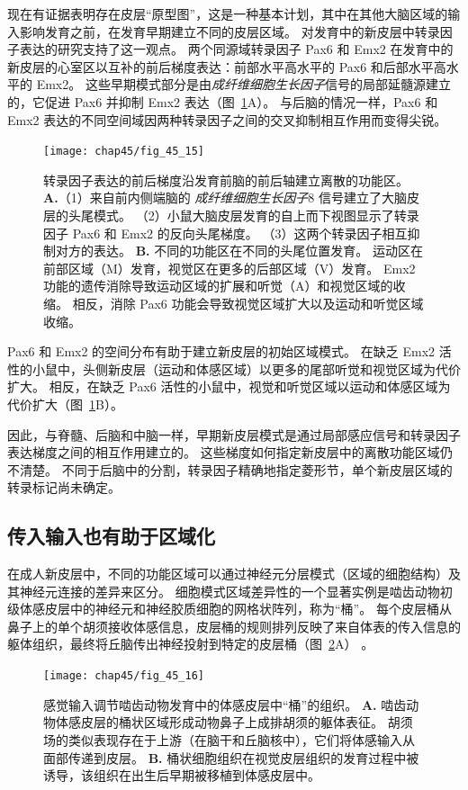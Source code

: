 现在有证据表明存在皮层“原型图”，这是一种基本计划，其中在其他大脑区域的输入影响发育之前，在发育早期建立不同的皮层区域。
对发育中的新皮层中转录因子表达的研究支持了这一观点。
两个同源域转录因子 Pax6 和 Emx2 在发育中的新皮层的心室区以互补的前后梯度表达：前部水平高水平的 Pax6 和后部水平高水平的 Emx2。
这些早期模式部分是由\textit{成纤维细胞生长因子}信号的局部延髓源建立的，它促进 Pax6 并抑制 Emx2 表达（图~\ref{fig:45_15}A）。
与后脑的情况一样，Pax6 和 Emx2 表达的不同空间域因两种转录因子之间的交叉抑制相互作用而变得尖锐。


\begin{figure}[htbp]
	\centering
	\texttt{[image: chap45/fig\_45\_15]}
	\caption{转录因子表达的前后梯度沿发育前脑的前后轴建立离散的功能区\cite{hamasaki2004emx2}。
		\textbf{A.}（1）来自前内侧端脑的 \textit{成纤维细胞生长因子}8 信号建立了大脑皮层的头尾模式。
		（2）小鼠大脑皮层发育的自上而下视图显示了转录因子 Pax6 和 Emx2 的反向头尾梯度。
		（3）这两个转录因子相互抑制对方的表达。
		\textbf{B.} 不同的功能区在不同的头尾位置发育。
		运动区在前部区域（M）发育，视觉区在更多的后部区域（V）发育。
		Emx2 功能的遗传消除导致运动区域的扩展和听觉（A）和视觉区域的收缩。
		相反，消除 Pax6 功能会导致视觉区域扩大以及运动和听觉区域收缩。}
	\label{fig:45_15}
\end{figure}


Pax6 和 Emx2 的空间分布有助于建立新皮层的初始区域模式。
在缺乏 Emx2 活性的小鼠中，头侧新皮层（运动和体感区域）以更多的尾部听觉和视觉区域为代价扩大。
相反，在缺乏 Pax6 活性的小鼠中，视觉和听觉区域以运动和体感区域为代价扩大（图~\ref{fig:45_15}B）。


因此，与脊髓、后脑和中脑一样，早期新皮层模式是通过局部感应信号和转录因子表达梯度之间的相互作用建立的。
这些梯度如何指定新皮层中的离散功能区域仍不清楚。
不同于后脑中的分割，转录因子精确地指定菱形节，单个新皮层区域的转录标记尚未确定。



\subsection{传入输入也有助于区域化}

在成人新皮层中，不同的功能区域可以通过神经元分层模式（区域的细胞结构）及其神经元连接的差异来区分。
细胞模式区域差异性的一个显著实例是啮齿动物初级体感皮层中的神经元和神经胶质细胞的网格状阵列，称为“桶”。
每个皮层桶从鼻子上的单个胡须接收体感信息，皮层桶的规则排列反映了来自体表的传入信息的躯体组织，最终将丘脑传出神经投射到特定的皮层桶（图~\ref{fig:45_16}A） 。


\begin{figure}[htbp]
	\centering
	\texttt{[image: chap45/fig\_45\_16]}
	\caption{感觉输入调节啮齿动物发育中的体感皮层中“桶”的组织\cite{schlaggar1991potential}。
		\textbf{A.} 啮齿动物体感皮层的桶状区域形成动物鼻子上成排胡须的躯体表征。
		胡须场的类似表现存在于上游（在脑干和丘脑核中），它们将体感输入从面部传递到皮层。
		\textbf{B.} 桶状细胞组织在视觉皮层组织的发育过程中被诱导，该组织在出生后早期被移植到体感皮层中。}
	\label{fig:45_16}
\end{figure}


